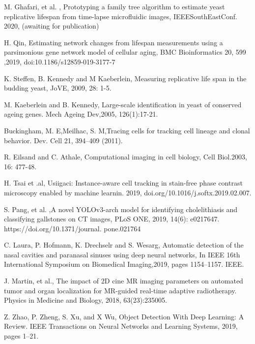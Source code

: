 \documentclass[conference]{IEEEtran}
\begin{document}
\begin{thebibliography}{00}
M. Ghafari,  et al. , Prototyping a family tree algorithm to estimate yeast replicative lifespan from time-lapse microfluidic images, IEEESouthEastConf. 2020, (awaiting for publication)

H. Qin, Estimating network changes from lifespan measurements using a parsimonious gene network model of cellular aging, BMC Bioinformatics 20, 599 ,2019, doi:10.1186/s12859-019-3177-7

K. Steffen, B. Kennedy and M Kaeberlein, Measuring replicative life span in the budding yeast, JoVE, 2009,  28: 1-5.

M. Kaeberlein and B. Kennedy, Large-scale identification in yeast of conserved ageing genes. Mech Ageing Dev,2005, 126(1):17-21.

Buckingham, M. E,Meilhac, S. M,Tracing cells for tracking cell lineage and clonal behavior. Dev. Cell 21, 394–409 (2011).

R. Eilsand and C. Athale, Computational imaging in cell biology, Cell Biol.2003, 16: 477-48.

H. Tsai et .al, Usiigaci: Instance-aware cell tracking in stain-free phase contrast microscopy enabled by machine learnin. 2019, doi.org/10.1016/j.softx.2019.02.007.

S. Pang,  et al. ,A novel YOLOv3-arch model for identifying cholelithiasis and classifying gallstones on CT images, PLoS ONE, 2019, 14(6): e0217647. https://doi.org/10.1371/journal. pone.021764

C.  Laura, P. Hofmann, K. Drechselr  and S. Wesarg, Automatic detection of the nasal cavities and paranasal sinuses using deep neural networks, In IEEE 16th International Symposium on Biomedical Imaging,2019, pages 1154–1157. IEEE.

J. Martin, et al., The impact of 2D cine MR imaging parameters on automated tumor and organ localization for MR-guided real-time adaptive radiotherapy. Physics in Medicine and Biology, 2018, 63(23):235005.

Z. Zhao, P. Zheng, S. Xu, and X Wu, Object Detection With Deep Learning: A Review. IEEE Transactions on Neural Networks and Learning Systems, 2019, pages 1–21.


\end{thebibliography}
\end{document}
